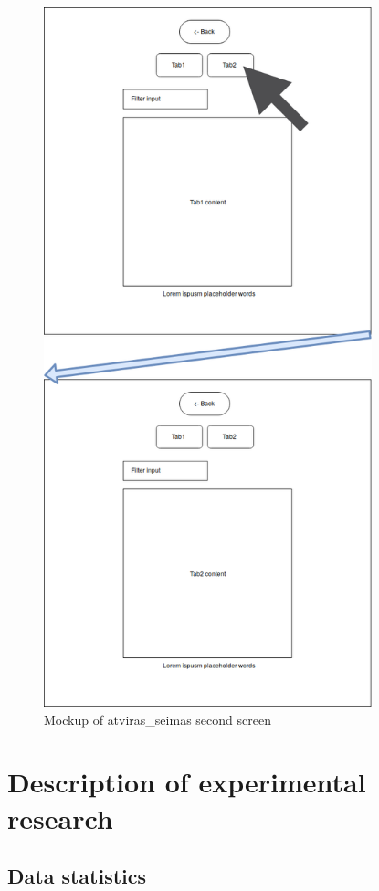 \documentclass[a4paper,12pt]{article}
\begin{document}
  	\begin{figure}[H]	
	\centering
	\includegraphics[width=9.5cm]{images/frontend_mockup_crop_2.png}
	\caption{Mockup of \gls{atviras_seimas} second screen}
	\label{fig:frontend_mockup_2}
	\end{figure}
    
    \clearpage
    
    \section{Description of experimental research}
    \subsection{Data statistics}
    
\end{document}
